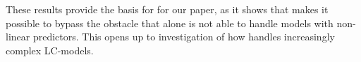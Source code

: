 These results provide the basis for for our paper, as it shows that \inlabru makes it possible to bypass the obstacle that \inla alone is not able to handle models with non-linear predictors. This opens up to investigation of how \inlabru handles increasingly complex LC-models. 

